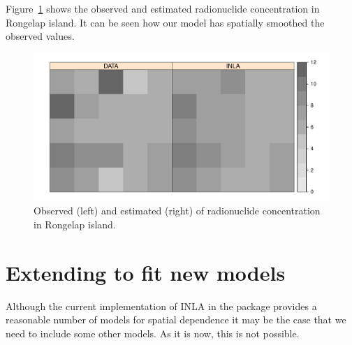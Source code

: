 \documentclass[article]{jss}
\begin{document}
\begin{Schunk}
\end{Schunk}

Figure~\ref{fig:geos} shows the observed and estimated radionuclide
concentration in Rongelap island. It can be seen how our model has spatially
smoothed the observed values.

\begin{figure}[h]
\begin{center}
\includegraphics{spatial_inla-012}
\caption{Observed (left) and estimated (right) of radionuclide concentration
in Rongelap island.}
\label{fig:geos}
\end{center}
\end{figure}



\section[Extending {R-INLA} to fit new models]{Extending  to fit new models} 

\label{sec:extINLA}


Although the current implementation of INLA in the  package
provides a reasonable number of models for spatial dependence it may be the
case that we need to include some other models. As it is now, this is not
possible.
\end{document}

